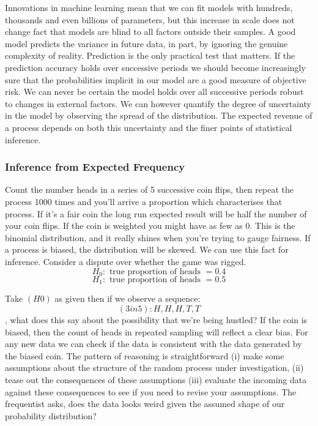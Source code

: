 \documentclass[10pt,a4paper,notitlepage, twocolumn]{article}
\begin{document}
Innovations in machine learning mean that we can fit models with hundreds, thousands and even billions of parameters, but this increase in scale does not change fact that models are blind to all factors outside their samples. A good model predicts the variance in future data, in part, by ignoring the genuine complexity of reality. Prediction is the only practical test that matters. If the prediction accuracy holds over successive periods we should become increasingly sure that the probabilities implicit in our model are a good measure of objective risk. We can never be certain the model holds over all successive periods robust to changes in external factors. We can however quantify the degree of uncertainty in the model by observing the spread of the distribution. The expected revenue of a process depends on both this uncertainty and the finer points of statistical inference. 

\raggedbottom

\subsubsection*{Inference from Expected Frequency}
Count the number heads in a series of 5 successive coin flips, then repeat the process 1000 times and you'll arrive a proportion which characterises that process. If it's a fair coin the long run expected result will be half the number of your coin flips. If the coin is weighted you might have as few as 0. This is the binomial distribution, and it really shines when you're trying to gauge fairness. If a process is biased, the distribution will be skewed. We can use this fact for inference. Consider a dispute over whether the game was rigged. 
$$ H_0 : \text{ true proportion of heads } = 0.4  $$
$$ H_1 : \text{ true proportion of heads } =  0.5 $$

\noindent Take $(H0)$ as given then if we observe a sequence: $$ (3in5): H, H, H, T, T$$, what does this say about the possibility that we're being hustled? If the coin is biased, then the count of heads in repeated sampling will reflect a clear bias. For any new data we can check if the data is consistent with the data generated by the biased coin. The pattern of reasoning is straightforward (i) make some assumptions about the structure of the random process under investigation, (ii) tease out the consequences of these assumptions (iii) evaluate the incoming data against these consequences to see if you need to revise your assumptions. The frequentist asks, does the data looks weird given the assumed shape of our probability distribution?
\end{document}
